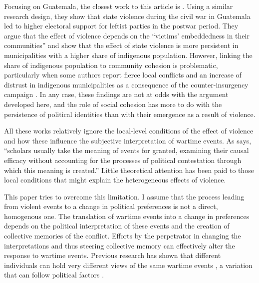 \documentclass[12pt, notitlepage]{article}
\begin{document}
Focusing on Guatemala, the closest work to this article is \citet{Vogt:2019aa}.
Using a similar research design, they show that state violence during the civil war in Guatemala led to higher electoral support for leftist parties in the postwar period.
They argue that the effect of violence depends on the ``victims' embeddedness in their communities'' and show that the effect of state violence is more persistent in municipalities with a higher share of indigenous population.
However, linking the share of indigenous population to community cohesion is problematic, particularly when some authors report fierce local conflicts and an increase of distrust in indigenous municipalities as a consequence of the counter-insurgency campaign \citep[e.g.][]{Burrell:2013aa}.
In any case, these findings are not at odds with the argument developed here, and the role of social cohesion has more to do with the persistence of political identities than with their emergence as a result of violence.

All these works relatively ignore the local-level conditions of the effect of violence and how these influence the subjective interpretation of wartime events.
As \citet[1244]{Basta:2018aa} says, ``scholars usually take the meaning of events for granted, examining their causal efficacy without accounting for the processes of political contestation through which this meaning is created.''
Little theoretical attention has been paid to those local conditions that might explain the heterogeneous effects of violence.

This paper tries to overcome this limitation.
I assume that the process leading from violent events to a change in political preferences is not a direct, homogenous one.
The translation of wartime events into a change in preferences depends on the political interpretation of these events and the creation of collective memories of the conflict.
Efforts by the perpetrator in changing the interpretations and thus steering collective memory can effectively alter the response to wartime events.
Previous research has shown that different individuals can hold very different views of the same wartime events \citep{Driscoll:2016aa}, a variation that can follow political factors \citep{Silverman:2019aa}.
\end{document}
